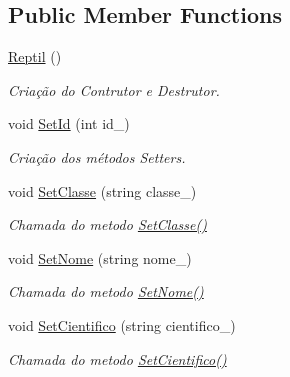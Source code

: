 \subsection*{Public Member Functions}
\begin{DoxyCompactItemize}
\item 
\mbox{\hyperlink{class_reptil_a8d4e391e335678b7ed64eda95e050553}{Reptil}} ()
\begin{DoxyCompactList}\small\item\em Criação do Contrutor e Destrutor. \end{DoxyCompactList}\item 
void \mbox{\hyperlink{class_reptil_a423a8162894755b69a63eefd91ba97a4}{Set\+Id}} (int id\+\_\+)
\begin{DoxyCompactList}\small\item\em Criação dos métodos Setters. \end{DoxyCompactList}\item 
\mbox{\label{class_reptil_a2bc2e371c5a2ff4a8caddddb2015621c}} 
void \mbox{\hyperlink{class_reptil_a2bc2e371c5a2ff4a8caddddb2015621c}{Set\+Classe}} (string classe\+\_\+)
\begin{DoxyCompactList}\small\item\em Chamada do metodo \mbox{\hyperlink{class_reptil_a2bc2e371c5a2ff4a8caddddb2015621c}{Set\+Classe()}} \end{DoxyCompactList}\item 
\mbox{\label{class_reptil_accbaa131894ade6bc1a4c7ad5f7b2a48}} 
void \mbox{\hyperlink{class_reptil_accbaa131894ade6bc1a4c7ad5f7b2a48}{Set\+Nome}} (string nome\+\_\+)
\begin{DoxyCompactList}\small\item\em Chamada do metodo \mbox{\hyperlink{class_reptil_accbaa131894ade6bc1a4c7ad5f7b2a48}{Set\+Nome()}} \end{DoxyCompactList}\item 
\mbox{\label{class_reptil_a006cddf27b96025050a97489b3da023b}} 
void \mbox{\hyperlink{class_reptil_a006cddf27b96025050a97489b3da023b}{Set\+Cientifico}} (string cientifico\+\_\+)
\begin{DoxyCompactList}\small\item\em Chamada do metodo \mbox{\hyperlink{class_reptil_a006cddf27b96025050a97489b3da023b}{Set\+Cientifico()}} \end{DoxyCompactList}\item 

\end{DoxyCompactItemize}
